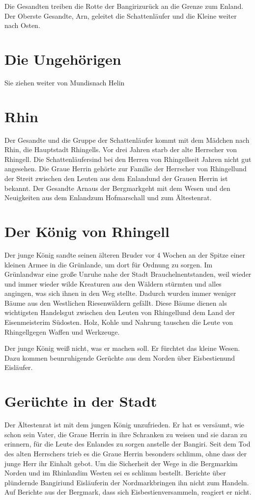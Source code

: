 \documentclass[12pt,a4paper,onecolumn,twoside,ngerman]{book}
\newcommand{\Bangiri}{Bangiri}
\newcommand{\Enland}{Enland}
\newcommand{\Schattenjager}{Schattenläufer}
\newcommand{\Nordmark}{Nordmark}
\newcommand{\Bergmark}{Bergmark}
\newcommand{\Arn}{Arn}
\newcommand{\Eislaufer}{Eisläufer}
\newcommand{\Eisbestien}{Eisbestien}
\newcommand{\Rhinland}{Rhinland}
\newcommand{\Rhingell}{Rhingell}
\newcommand{\Mundis}{Mundis}
\newcommand{\Helin}{Helin}
\newcommand{\Rhin}{Rhin}
\newcommand{\Grunland}{Grünland}
\newcommand{\Braucheln}{Braucheln}
\newcommand{\Eisenmeister}{Eisenmeister}
\begin{document}
Die Gesandten treiben die Rotte der \Bangiri zurück an die Grenze zum \Enland. Der Oberste Gesandte, \Arn{,} geleitet die Schattenläufer und die Kleine weiter nach Osten.

\section{Die Ungehörigen}

Sie ziehen weiter von \Mundis nach \Helin

\section{\Rhin}

Der Gesandte und die Gruppe der Schattenläufer kommt mit dem Mädchen nach \Rhin, die Hauptstadt \Rhingell{s}. Vor drei Jahren starb der alte Herrscher von \Rhingell. Die \Schattenjager sind bei den Herren von \Rhingell seit Jahren nicht gut angesehen. Die Graue Herrin gehörte zur Familie der Herrscher von \Rhingell und der Streit zwischen den Leuten aus dem \Enland und der Grauen Herrin ist bekannt. Der Gesandte \Arn aus der \Bergmark geht mit dem Wesen und den Neuigkeiten aus dem \Enland zum Hofmarschall und zum Ältestenrat.

\section{Der König von \Rhingell}
Der junge König sandte seinen älteren Bruder vor 4 Wochen an der Spitze einer kleinen Armee in die \Grunland{e}, um dort für Ordnung zu sorgen. Im \Grunland war eine große Unruhe nahe der Stadt \Braucheln entstanden, weil wieder und immer wieder wilde Kreaturen aus den Wäldern stürmten und alles angingen, was sich ihnen in den Weg stellte. Dadurch wurden immer weniger Bäume aus den Westlichen Riesenwäldern gefällt. Diese Bäume dienen als wichtigsten Handelsgut zwischen den Leuten von \Rhingell und dem Land der \Eisenmeister im Südosten. Holz, Kohle und Nahrung tauschen die Leute von \Rhingell gegen Waffen und Werkzeuge.

Der junge König weiß nicht, was er machen soll. Er fürchtet das kleine Wesen. Dazu kommen beunruhigende Gerüchte aus dem Norden über \Eisbestien und \Eislaufer. 

\section{Gerüchte in der Stadt}
Der Ältestenrat ist mit dem jungen König unzufrieden. Er hat es versäumt, wie schon sein Vater, die Graue Herrin in ihre Schranken zu weisen und sie daran zu erinnern, für die Leute des \Enland{es} zu sorgen anstelle der \Bangiri. Seit dem Tod des alten Herrschers trieb es die Graue Herrin besonders schlimm, ohne dass der junge Herr ihr Einhalt gebot. Um die Sicherheit der Wege in die \Bergmark im Norden und im \Rhinland im Westen sei es schlimm bestellt. Berichte über plündernde \Bangiri und \Eislaufer in der \Nordmark bringen ihn nicht zum Handeln. Auf Berichte aus der \Bergmark, dass sich \Eisbestien versammeln, reagiert er nicht.
\end{document}
